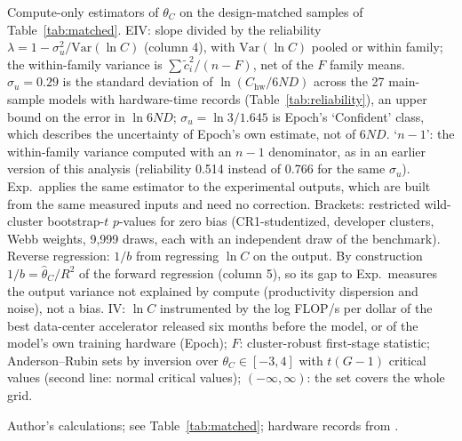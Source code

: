 \begin{table}[tp]
\begin{tablenotes}
Compute-only estimators of $\theta_C$ on the design-matched samples of Table~\ref{tab:matched}. EIV: slope divided by the reliability $\lambda=1-\sigma_u^2/\text{Var}(\ln C)$ (column 4), with $\text{Var}(\ln C)$ pooled or within family; the within-family variance is $\sum\tilde c_i^2/(n-F)$, net of the $F$ family means. $\sigma_u=0.29$ is the standard deviation of $\ln(C_{\text{hw}}/6ND)$ across the 27 main-sample models with hardware-time records (Table~\ref{tab:reliability}), an upper bound on the error in $\ln 6ND$; $\sigma_u=\ln3/1.645$ is Epoch's `Confident' class, which describes the uncertainty of Epoch's own estimate, not of $6ND$. `$n-1$': the within-family variance computed with an $n-1$ denominator, as in an earlier version of this analysis (reliability 0.514 instead of 0.766 for the same $\sigma_u$). Exp.\ applies the same estimator to the experimental outputs, which are built from the same measured inputs and need no correction. Brackets: restricted wild-cluster bootstrap-$t$ $p$-values for zero bias (CR1-studentized, developer clusters, Webb weights, 9,999 draws, each with an independent draw of the benchmark). Reverse regression: $1/b$ from regressing $\ln C$ on the output. By construction $1/b=\hat\theta_C/R^2$ of the forward regression (column 5), so its gap to Exp.\ measures the output variance not explained by compute (productivity dispersion and noise), not a bias. IV: $\ln C$ instrumented by the log FLOP/s per dollar of the best data-center accelerator released six months before the model, or of the model's own training hardware (Epoch); $F$: cluster-robust first-stage statistic; Anderson--Rubin sets by inversion over $\theta_C\in[-3,4]$ with $t(G-1)$ critical values (second line: normal critical values); $(-\infty,\infty)$: the set covers the whole grid.
\end{tablenotes}
\begin{tablenotes}[Source]
Author's calculations; see Table~\ref{tab:matched}; hardware records from \citet{epochai2026data}.
\end{tablenotes}
\end{table}
